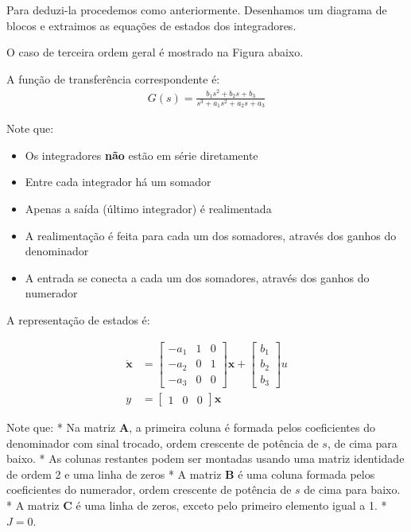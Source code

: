 \documentclass[
]{book}
\providecommand{\tightlist}{%
  \setlength{\itemsep}{0pt}\setlength{\parskip}{0pt}}
\begin{document}
Para deduzi-la procedemos como anteriormente. Desenhamos um diagrama de
blocos e extraimos as equações de estados dos integradores.

O caso de terceira ordem geral é mostrado na Figura abaixo.



A função de transferência correspondente é: \[
\begin{align*}
    G(s) = \frac{b_1s^2+b_2s+b_3}{s^3+a_1s^2+a_2s+a_3}
\end{align*}
\]

Note que:

\begin{itemize}
\tightlist
\item
  Os integradores \textbf{não} estão em série diretamente
\item
  Entre cada integrador há um somador
\item
  Apenas a saída (último integrador) é realimentada
\item
  A realimentação é feita para cada um dos somadores, através dos
  ganhos do denominador
\item
  A entrada se conecta a cada um dos somadores, através dos ganhos do
  numerador
\end{itemize}

A representação de estados é:

\[
\begin{align*}
    \mathbf{\dot{x}} &= \left[
        \begin{array}{rrr}
        -a_1 & 1 & 0\\
        -a_2 & 0 & 1\\
        -a_3 & 0 & 0\end{array}
    \right]\mathbf{{x}}+
    \left[\begin{array}{rrr}
        b_1\\
        b_2\\
        b_3\end{array}
    \right]u\\
    y &= \left[\begin{array}{ccc} 1 & 0 & 0\end{array}\right]\mathbf{x}
\end{align*}
\]

Note que: * Na matriz \(\mathbf{A}\), a primeira coluna é formada pelos
coeficientes do denominador com sinal trocado, ordem crescente de
potência de \(s\), de cima para baixo. * As colunas restantes podem ser
montadas usando uma matriz identidade de ordem 2 e uma linha de zeros *
A matriz \(\mathbf{B}\) é uma coluna formada pelos coeficientes do
numerador, ordem crescente de potência de \(s\) de cima para baixo. * A
matriz \(\mathbf{C}\) é uma linha de zeros, exceto pelo primeiro elemento
igual a 1. * \(J=0\).
\end{document}
